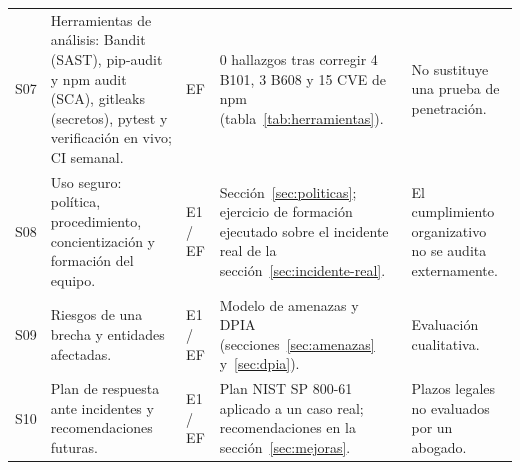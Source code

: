 {\begin{longtable}{@{}P{.055\textwidth}P{.26\textwidth}P{.06\textwidth}P{.29\textwidth}P{.23\textwidth}@{}}
S07 & Herramientas de análisis: Bandit (SAST), pip-audit y npm audit (SCA), gitleaks (secretos), pytest y verificación en vivo; CI semanal. & EF & 0 hallazgos tras corregir 4 B101, 3 B608 y 15 CVE de npm (tabla~\ref{tab:herramientas}). & No sustituye una prueba de penetración.\\
S08 & Uso seguro: política, procedimiento, concientización y formación del equipo. & E1 / EF & Sección~\ref{sec:politicas}; ejercicio de formación ejecutado sobre el incidente real de la sección~\ref{sec:incidente-real}. & El cumplimiento organizativo no se audita externamente.\\
S09 & Riesgos de una brecha y entidades afectadas. & E1 / EF & Modelo de amenazas y DPIA (secciones~\ref{sec:amenazas} y~\ref{sec:dpia}). & Evaluación cualitativa.\\
S10 & Plan de respuesta ante incidentes y recomendaciones futuras. & E1 / EF & Plan NIST SP 800-61 aplicado a un caso real; recomendaciones en la sección~\ref{sec:mejoras}. & Plazos legales no evaluados por un abogado.\\
\bottomrule
\end{longtable}
}
